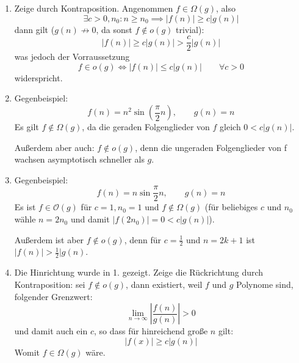 \documentclass{scrartcl}
\begin{document}
\begin{enumerate}
\item
Zeige durch Kontraposition. Angenommen $f\in\Omega(g)$, also
\[
\exists c>0,n_0:n\ge n_0 \implies |f(n)| \ge c|g(n)|
\]
dann gilt ($g(n)\not\to 0$, da sonst $f\not\in o(g)$ trivial):
\[
|f(n)| \ge c|g(n)| > \frac c2|g(n)|
\]
was jedoch der Vorraussetzung
\[
f\in o(g) \iff |f(n)|\le c|g(n)| \qquad \forall c>0
\]
widerspricht.

\item
Gegenbeispiel:
\[
f(n)=n^2\sin(\frac \pi2n), \qquad g(n)=n
\]
Es gilt $f\not\in\Omega(g)$, da die geraden Folgenglieder von $f$ gleich $0<c|g(n)|$.

Außerdem aber auch: $f\not\in o(g)$, denn die ungeraden Folgenglieder von f wachsen asymptotisch schneller als $g$.

\item
Gegenbeispiel:
\[
f(n)=n\sin{\frac \pi2n}, \qquad g(n)=n
\]
Es ist $f\in\mathcal O(g)$ für $c=1,n_0=1$ und $f\not\in\Omega(g)$ (für beliebiges $c$ und $n_0$ wähle $n=2n_0$ und damit $|f(2n_0)|=0<c|g(n)|$).

Außerdem ist aber $f\not\in o(g)$, denn für $c=\frac 12$ und $n=2k+1$ ist $|f(n)|>\frac 12|g(n)$.

\item
Die Hinrichtung wurde in 1. gezeigt.
Zeige die Rückrichtung durch Kontraposition: sei $f\not\in o(g)$, dann existiert, weil $f$ und $g$ Polynome sind, folgender Grenzwert:
\[
\lim_{n\to\infty}\left|\frac{f(n)}{g(n)}\right|>0
\]
und damit auch ein $c$, so dass für hinreichend große $n$ gilt:
\[
|f(x)|\ge c|g(n)|
\]
Womit $f\in\Omega(g)$ wäre.

\end{enumerate}
\end{document}

